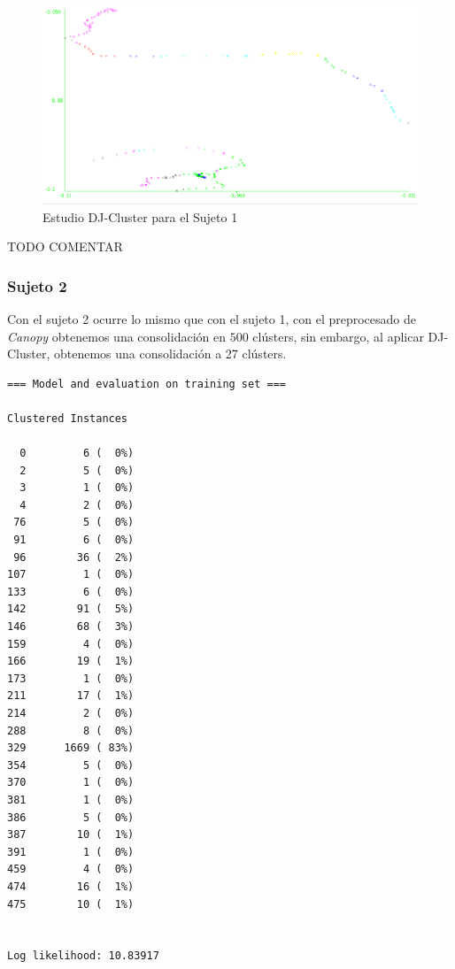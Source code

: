 \documentclass[a4paper, 12pt]{article}
\begin{document}
\begin{figure}[H]
	\includegraphics[scale=.5]{../comparativa/djClusterSujeto1.png}
	\caption{Estudio DJ-Cluster para el Sujeto 1}
\end{figure}


TODO COMENTAR

\subsubsection{Sujeto 2}

Con el sujeto 2 ocurre lo mismo que con el sujeto 1, con el preprocesado de \textit{Canopy} obtenemos una consolidaci\'on en $500$ cl\'usters, sin embargo, al aplicar DJ-Cluster, obtenemos una consolidaci\'on a 27 cl\'usters.\\

\begin{verbatim}
=== Model and evaluation on training set ===

Clustered Instances

  0         6 (  0%)
  2         5 (  0%)
  3         1 (  0%)
  4         2 (  0%)
 76         5 (  0%)
 91         6 (  0%)
 96        36 (  2%)
107         1 (  0%)
133         6 (  0%)
142        91 (  5%)
146        68 (  3%)
159         4 (  0%)
166        19 (  1%)
173         1 (  0%)
211        17 (  1%)
214         2 (  0%)
288         8 (  0%)
329      1669 ( 83%)
354         5 (  0%)
370         1 (  0%)
381         1 (  0%)
386         5 (  0%)
387        10 (  1%)
391         1 (  0%)
459         4 (  0%)
474        16 (  1%)
475        10 (  1%)


Log likelihood: 10.83917
\end{verbatim}
\end{document}
